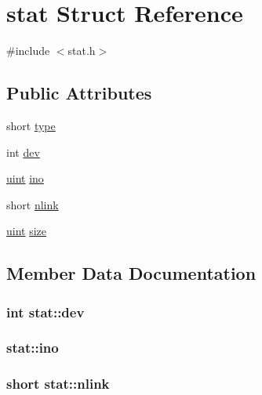 \hypertarget{structstat}{}\section{stat Struct Reference}
\label{structstat}


{\ttfamily \#include $<$stat.\+h$>$}

\subsection*{Public Attributes}
\begin{DoxyCompactItemize}
\item 
short \hyperlink{structstat_a01f1b4cd7627d192a7875c9a188e0699}{type}
\item 
int \hyperlink{structstat_a14ef4f85e6fb86bf296360361d0f393b}{dev}
\item 
\hyperlink{types_8h_a91ad9478d81a7aaf2593e8d9c3d06a14}{uint} \hyperlink{structstat_abf15624517ed5d79d0fa2a5553a68e25}{ino}
\item 
short \hyperlink{structstat_a99ca3487fd2f4799337eb4281f8871e4}{nlink}
\item 
\hyperlink{types_8h_a91ad9478d81a7aaf2593e8d9c3d06a14}{uint} \hyperlink{structstat_a4ac15b64dd4d787c59a8a687d79adb35}{size}
\end{DoxyCompactItemize}


\subsection{Member Data Documentation}
\subsubsection[{\texorpdfstring{dev}{dev}}]{\setlength{\rightskip}{0pt plus 5cm}int stat\+::dev}\hypertarget{structstat_a14ef4f85e6fb86bf296360361d0f393b}{}\label{structstat_a14ef4f85e6fb86bf296360361d0f393b}
\subsubsection[{\texorpdfstring{ino}{ino}}]{ stat\+::ino}\hypertarget{structstat_abf15624517ed5d79d0fa2a5553a68e25}{}\label{structstat_abf15624517ed5d79d0fa2a5553a68e25}
\subsubsection[{\texorpdfstring{nlink}{nlink}}]{\setlength{\rightskip}{0pt plus 5cm}short stat\+::nlink}\hypertarget{structstat_a99ca3487fd2f4799337eb4281f8871e4}{}\label{structstat_a99ca3487fd2f4799337eb4281f8871e4}
